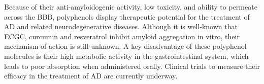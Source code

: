 


Because of their anti-amyloidogenic activity, low toxicity, and ability to permeate across the BBB, polyphenols display therapeutic potential for the treatment of AD and related neurodegenerative diseases.  Although it is well-known that ECGC, curcumin and resveratrol inhibit amyloid aggregation in vitro, their mechanism of action is still unknown. A key disadvantage of these polyphenol molecules is their high metabolic activity in the gastrointestinal system, which leads to poor absorption when administered orally.\cite{Baur:2006bx,Smith:2011iq,Hamaguchi:2010wu} Clinical trials to measure their efficacy in the treatment of AD are currently underway.



